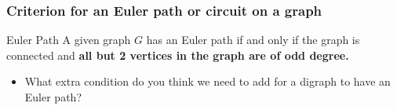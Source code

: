 \documentclass{beamer}
\begin{document}

\begin{frame}
\frametitle{Criterion for an Euler path or circuit on a graph}
\begin{block}{Euler Path}
A given graph $G$ has an Euler path if and only if the graph is connected and  \textbf{all but 2 vertices in the graph are of odd degree.}
\end{block}
\pause
\begin{itemize}
\item What extra condition do you think we need to add for a digraph to have an Euler path?
\end{itemize}
\end{frame}

\end{document}
